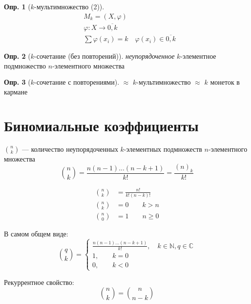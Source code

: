 \documentclass[a4paper,12pt]{article}
\numberwithin{figure}{section}
\theoremstyle{definition}
\newtheorem{definition}{Опр.}[section]
\theoremstyle{definition}
\begin{document}
\begin{definition}[$k$-мультимножество (2)]
	\begin{align*}
		& M_k = (X, \varphi) \\
		& \varphi: X \rightarrow \overline{0,k} \\
		& \sum{\varphi(x_i)} = k \quad \varphi(x_i) \in \overline{0,k}
	\end{align*}
\end{definition}

\begin{definition}[$k$-сочетание (без повторений)]
	\textit{неупорядоченное} $k$-элементное подмножество $n$-элементного множества
\end{definition}

\begin{definition}[$k$-сочетание с повторениями]
	$\approx$ $k$-мультимножество $\approx$ $k$ монеток в кармане
\end{definition}



\section{Биномиальные коэффициенты}

$\binom{n}{k}$ --- количество неупорядоченных $k$-элементных подмножеств $n$-элементного множества
	\[ \binom{n}{k} = \frac{n(n-1)...(n-k+1)}{k!} = \frac{(n)_k}{k!} \]


\begin{align*}
	\binom{n}{k} &= \frac{n!}{k!(n-k)!} \\
	\binom{n}{k} &= 0 \qquad k > n \\
	\binom{n}{0} &= 1 \qquad n \geqslant 0
\end{align*}

В самом общем виде:
	\[ \binom{q}{k} = \begin{cases*}
		\frac{n(n-1)...(n-k+1)}{k!}, \quad k \in \mathbb{N}, q \in \mathbb{C} \\
		1,  \qquad k=0 \\
		0,  \qquad k<0
	\end{cases*} \]

Рекуррентное свойство:
\[ \binom{n}{k} = \binom{n}{n-k} \]
\end{document}
